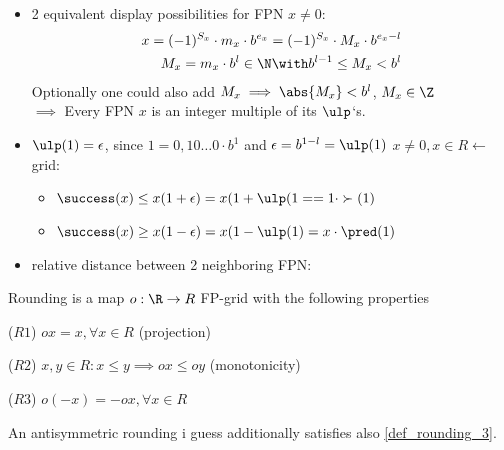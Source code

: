 \begin{itemize}
    \item 2 equivalent display possibilities for FPN $x\neq 0:$
    \begin{align*}
    	x=(-1)^{S_x}\cdot m_x\cdot b^{e_x}=(-1)^{S_x}\cdot M_x\cdot b^{e_x-l}\\
        M_x=m_x\cdot b^l \in \N \with b^{l-1}\le M_x<b^l
    \end{align*}
    Optionally one could also add $M_x \implies \abs{M_x}<b^l$, $M_x\in \Z$\\
    $\implies$ Every FPN $x$ is an integer multiple of its $\ulp$`s.
    \item $\ulp(1)=\epsilon$, since $1=0,10\dots0\cdot b^1$ and $\epsilon=b^{1-l}=\ulp(1)$ $x\not =0, x\in R \leftarrow$ grid: 
    \begin{itemize}
        \item $\success(x)\le x(1+\epsilon)=x(1+\ulp(1= = 1\cdot \succ(1)$
        \item $\success(x)\ge x(1-\epsilon)=x(1-\ulp(1)=x\cdot \pred(1)$
    \end{itemize}
    \item relative distance between 2 neighboring FPN:
   \end{itemize}
    \begin{*definition}[Rounding]
    	Rounding is a map $o:\R\to R $ FP-grid with the following properties
    	\begin{defenum}
    		\item ($R1$) $ox=x, \forall x\in R$ (projection) \label{def_rounding_1}
    		\item ($R2$) $x,y \in R: x\le y \implies ox\le oy$ (monotonicity) \label{def_rounding_2}
    		\item ($R3$) $o(-x)=-ox, \forall x\in R$ \label{def_rounding_3}
    	\end{defenum}
    \end{*definition}
	\begin{*remark}
		An antisymmetric rounding i guess additionally satisfies also \ref{def_rounding_3}.
	\end{*remark}
